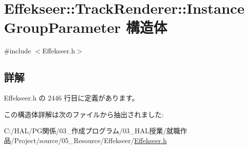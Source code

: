 \hypertarget{struct_effekseer_1_1_track_renderer_1_1_instance_group_parameter}{}\section{Effekseer\+:\+:Track\+Renderer\+:\+:Instance\+Group\+Parameter 構造体}
\label{struct_effekseer_1_1_track_renderer_1_1_instance_group_parameter}


{\ttfamily \#include $<$Effekseer.\+h$>$}



\subsection{詳解}


 Effekseer.\+h の 2446 行目に定義があります。



この構造体詳解は次のファイルから抽出されました\+:\begin{DoxyCompactItemize}
\item 
C\+:/\+H\+A\+L/\+P\+G関係/03\+\_\+作成プログラム/03\+\_\+\+H\+A\+L授業/就職作品/\+Project/source/05\+\_\+\+Resource/\+Effekseer/\mbox{\hyperlink{_effekseer_8h}{Effekseer.\+h}}\end{DoxyCompactItemize}

